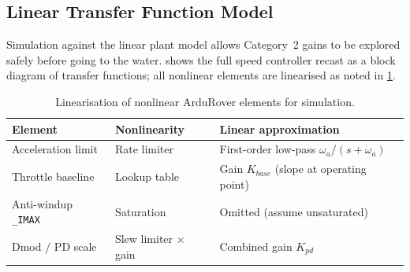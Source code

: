 \documentclass[../../book.tex]{subfiles}
\begin{document}
\subsection{Linear Transfer Function Model}
\label{sec:tf_model}

Simulation against the linear plant model allows
Category~2 gains to be explored safely before going to the water.
 shows the full speed controller recast as
a block diagram of transfer functions; all nonlinear elements are linearised
as noted in \cref{tab:linearisations}.

\begin{table}[htbp]
\centering
\caption{Linearisation of nonlinear ArduRover elements for simulation.}
\label{tab:linearisations}
\begin{tabular}{lll}
\toprule
Element & Nonlinearity & Linear approximation \\
\midrule
Acceleration limit & Rate limiter   & First-order low-pass $\omega_a/(s+\omega_a)$ \\
Throttle baseline  & Lookup table   & Gain $K_{base}$ (slope at operating point) \\
Anti-windup \texttt{\_IMAX} & Saturation & Omitted (assume unsaturated) \\
Dmod / PD scale    & Slew limiter $\times$ gain & Combined gain $K_{pd}$ \\
\bottomrule
\end{tabular}
\end{table}
\end{document}
